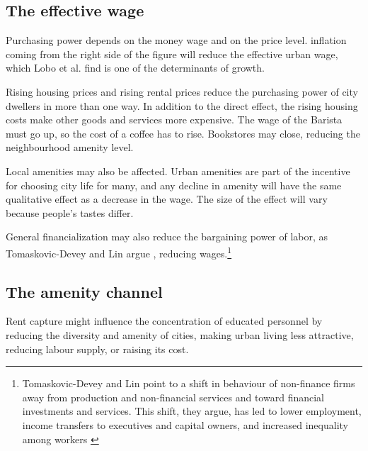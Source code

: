 \subsection{The effective wage}

Purchasing power depends on the money wage and on the price level. inflation coming from the right side of the figure will reduce the effective urban wage, which Lobo et al. find is one of the determinants of growth. 

 Rising housing prices and rising rental prices reduce the purchasing power of city dwellers in more than one way. In addition to the direct effect, the rising housing costs make other goods and services more expensive. The wage of the Barista must go up, so the cost of a coffee has to rise. Bookstores may close, reducing the neighbourhood amenity level. 
 
 Local amenities may also be affected. Urban amenities  are part of the incentive for choosing city life for many, and any decline in amenity will have the same qualitative effect as a decrease in the wage. The size of the effect will vary because people's tastes differ. 


 General financialization may also reduce the bargaining power of labor, as Tomaskovic-Devey and Lin argue \cite{tomaskovic-deveyFinancializationCausesInequality2013}, reducing wages.\footnote{Tomaskovic-Devey and Lin point to a shift in behaviour of non-finance firms away from production and non-financial services and toward financial investments and services. This shift, they argue,  has led to lower employment, income transfers to executives and capital owners, and increased inequality among workers \cite{tomaskovic-deveyFinancializationCausesInequality2013}}


\subsection{The amenity channel}
Rent capture might influence the concentration of educated personnel by reducing the diversity and amenity of cities, making urban living less attractive, reducing labour supply, or raising its cost.



